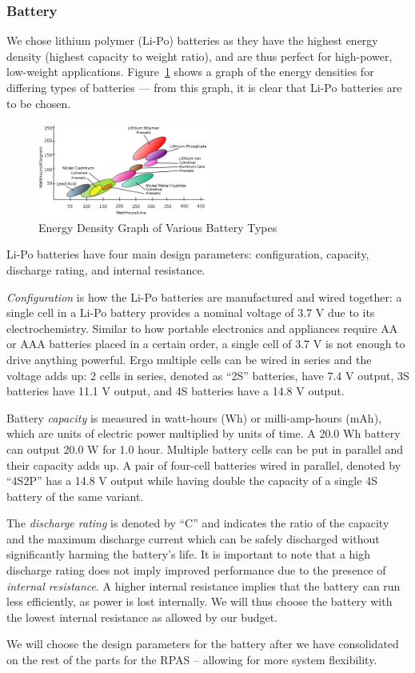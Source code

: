 \subsubsection{Battery}

We chose lithium polymer (Li-Po) batteries as they have the highest energy density (highest capacity to weight ratio), and are thus  perfect for high-power, low-weight applications. Figure~\ref{fig:batterytypes} shows a graph of the energy densities for differing types of batteries \cite{battery} --- from this graph, it is clear that Li-Po batteries are to be chosen.

\begin{figure}[h]
    \centering
    \includegraphics[width=0.5\textwidth]{img/energydensity.png}
    \caption{Energy Density Graph of Various Battery Types}
    \label{fig:batterytypes}
\end{figure}

Li-Po batteries have four main design parameters: configuration, capacity, discharge rating, and internal resistance.

\textit{Configuration} is how the Li-Po batteries are manufactured and wired together: a single cell in a Li-Po battery provides a 
nominal voltage of 3.7 V due to its electrochemistry.
Similar to how portable electronics and appliances require AA or AAA batteries placed in a certain order, a single cell of 3.7 V is not enough to drive anything powerful. Ergo multiple cells can be wired in series and the 
voltage adds up: 2 cells in series, denoted as ``2S'' batteries, have 7.4 V output, 3S batteries have 11.1 V output, and 4S batteries have a 14.8 V output. 

Battery \textit{capacity} is measured in watt-hours (Wh) or milli-amp-hours (mAh), which are units of electric power multiplied by units of time. A 20.0 Wh battery can output 20.0 W for 1.0 hour. Multiple battery cells can be put in parallel and their capacity adds up. A pair of four-cell batteries wired in parallel, denoted by ``4S2P'' has a 14.8 V output while having double the capacity of a single 4S battery of the same variant.

The \textit{discharge rating} is denoted by ``C'' and indicates the ratio of the capacity and the maximum discharge current which can be safely discharged without significantly harming the battery's life. It is important to note that a high discharge rating does not imply improved performance due to the presence of \textit{internal resistance}. A higher internal resistance implies that the battery can run less efficiently, as power is lost internally\cite{battery-c}. We will thus choose the battery with the lowest internal resistance as allowed by our budget. 

We will choose the design parameters for the battery after we have consolidated on the rest of the parts for the RPAS -- allowing for more system flexibility. 
